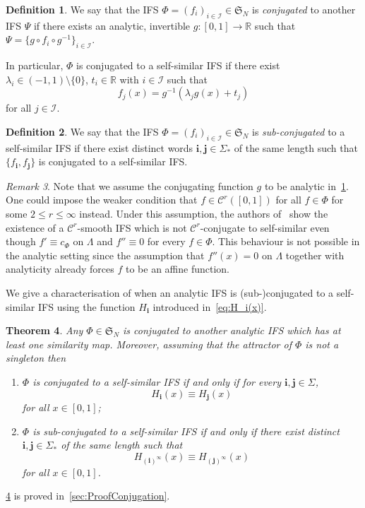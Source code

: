 \documentclass[11pt,]{article}
\def\cref#1{\ref{#1}}%
\newtheorem{theorem}{Theorem}[section]
\theoremstyle{definition}
\newtheorem{definition}[theorem]{Definition}
\theoremstyle{remark}
\newtheorem{remark}[theorem]{Remark}
\renewcommand{\Bbb}[1]{\mathbb{#1}}
\newcommand{\bbR}{{\Bbb R}}        %
\newcommand{\0}{\mathbf{0}}
\newcommand{\bi}{\mathbf{i}}
\newcommand{\bj}{\mathbf{j}}
\begin{document}
\begin{definition}\label{def:conjugation}
  We say that the IFS $\Phi = (f_i)_{i\in\mathcal{I}} \in\mathfrak{S}_N$ is 
\emph{conjugated} to another IFS $\Psi$ if there exists an analytic, invertible
  $g:[0,1]\to\bbR$ such that $\Psi=\{g\circ f_i\circ g^{-1}\}_{i\in\mathcal{I}}$. 
\end{definition}
In particular, $\Phi$
  is conjugated to a self-similar IFS if there exist $\lambda_i
\in(-1,1)\setminus\{0\}$, $t_i\in\bbR$ with $i\in\mathcal{I}$ such that
\[
f_{j}(x) = g^{-1}(\lambda_j g(x) + t_j)
\]
for all $j\in\mathcal{I}$.
\begin{definition}
  We say that the IFS $\Phi = (f_i)_{i\in\mathcal{I}} \in\mathfrak{S}_N$ is 
  \emph{sub-conjugated} to a self-similar IFS if there exist distinct words $\bi,\bj\in\Sigma_*$ of
  the same length such that $\{f_{\bi},f_{\bj}\}$ is conjugated to a self-similar IFS.
\end{definition}

\begin{remark}
  Note that we assume the conjugating function $g$ to be analytic in~\cref{def:conjugation}. One could
  impose the weaker condition that $f\in\mathcal{C}^r([0,1])$ for all $f\in\Phi$ for some $2\leq r\leq
  \infty$ instead. Under this assumption, the authors of~\cite{AlgomEtal_NonLinHyperbolicIFS} show the
  existence of a $\mathcal{C}^r$-smooth IFS which is not $\mathcal{C}^r$-conjugate to self-similar
  even though $f'\equiv c_{\Phi}$ on $\Lambda$ and $f''\equiv 0$ for every $f\in\Phi$. This behaviour
  is not possible in the analytic setting since the assumption that $f''(x)=0$ on $\Lambda$ together
  with analyticity already forces $f$ to be an affine function. 
\end{remark}

We give a characterisation of when an analytic IFS is (sub-)conjugated to a self-similar IFS using
the function $H_{\bi}$ introduced in~\cref{eq:H_i(x)}.

\begin{theorem}\label{thm:SubConjugation}
  Any $\Phi\in\mathfrak{S}_N$ is conjugated to another analytic IFS which has at least one similarity map. 
  Moreover, assuming that the attractor of $\Phi$ is not a singleton then 
  \begin{enumerate}
    \item\label{it:conj1} $\Phi$ is conjugated to a self-similar IFS if and only if for every
      $\bi,\bj\in\Sigma$,
      \[
	H_{\bi}(x) \equiv H_{\bj}(x)
      \]
      for all $x\in[0,1]$;
    \item\label{it:conj2} $\Phi$ is sub-conjugated to a self-similar IFS if and only if there exist
      distinct $\bi,\bj\in\Sigma_*$
      of the same length such that 
      \[
	H_{(\bi)^\infty}(x) \equiv H_{(\bj)^\infty}(x)
      \]
      for all $x\in[0,1]$.
  \end{enumerate}
\end{theorem}
\cref{thm:SubConjugation} is proved in~\cref{sec:ProofConjugation}.
\end{document}

